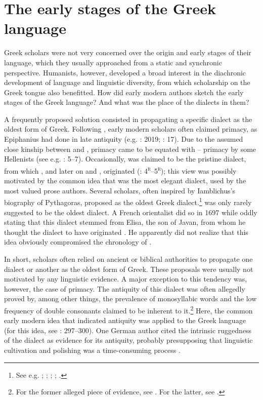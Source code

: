 \section{The early stages of the Greek language}\label{sec:5.4}

Greek scholars were not very concerned over the origin and early stages of their language, which they usually approached from a static and synchronic perspective. Humanists, however, developed a broad interest in the diachronic development of language and linguistic diversity, from which scholarship on the Greek tongue also benefitted. How did early modern authors sketch the early stages of the Greek language? And what was the place of the dialects in them?

A frequently proposed solution consisted in propagating a specific dialect as the oldest form of Greek. Following , early modern scholars often claimed  primacy, as Epiphanius had done in late antiquity (e.g. \citealt{Alsted1630}: 2019; \citealt{Von1705}: 17). Due to the assumed close kinship between  and ,  primacy came to be equated with – primacy by some Hellenists (see e.g. \citealt{Schmidt1604}: 5–7). Occasionally,  was claimed to be the pristine dialect, from which , and later on  and , originated (\citealt{Baile1588}: 4\textsc{\textsuperscript{r}}–5\textsc{\textsuperscript{r}}); this view was possibly motivated by the common idea that  was the most elegant dialect, used by the most valued prose authors. Several scholars, often inspired by Iamblichus’s biography of Pythagoras, proposed  as the oldest Greek dialect.\footnote{See e.g. \citet[860]{Goropius1569}; \citet[29]{Burton1657}; \citet[118]{Mazzocchi1754}; \citet[\textsc{iv}]{Facius1782}; \citet[21]{Gedike1782}.}  was only rarely suggested to be the oldest dialect. A French orientalist did so in 1697 while oddly stating that this dialect stemmed from Elisa, the son of Javan, from whom he thought the  dialect to have originated \citep[110]{Thomassin1697}. He apparently did not realize that this idea obviously compromised the chronology of .

In short, scholars often relied on ancient or biblical authorities to propagate one dialect or another as the oldest form of Greek. These proposals were usually not motivated by any linguistic evidence. A major exception to this tendency was, however, the case of  primacy. The antiquity of this dialect was often allegedly proved by, among other things, the prevalence of monosyllabic words and the low frequency of double consonants claimed to be inherent to it.\footnote{For the former alleged piece of evidence, see \citet[17]{Munthe1748}. For the latter, see \citet[\textsc{xxvi}]{Harles1778}.} Here, the common early modern idea that  indicated antiquity was applied to the Greek language (for this idea, see \citealt{Jansen1995}: 297–300). One German author cited the intrinsic ruggedness of the  dialect as evidence for its antiquity, probably presupposing that linguistic cultivation and polishing was a time-consuming process \citep[21]{Gedike1782}.

